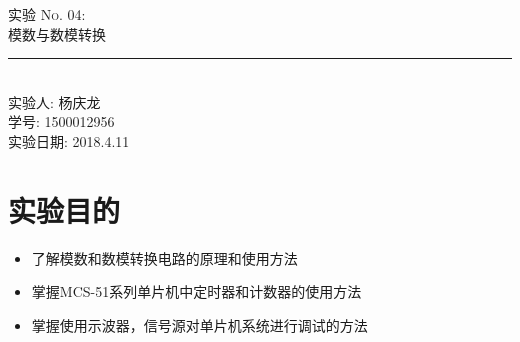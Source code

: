 
\newcommand{\labno}{04}
\newcommand{\labtitle}{模数与数模转换}
\newcommand{\authorname}{杨庆龙}
\newcommand{\idnumber}{1500012956}
\newcommand{\labdate}{2018.4.11}



\begin{CJK}

\begin{titlepage}
\begin{center}
{\LARGE \textsc{实验 No. \labno:} \\ \vspace{4pt}}
{\Large \textsc{\labtitle} \\ \vspace{4pt}}
\rule[13pt]{\textwidth}{1pt} \\ \vspace{150pt}
{\large 实验人: \authorname \\ \vspace{10pt}
学号: \idnumber \\ \vspace{10pt}
实验日期: \labdate}
\end{center}
\end{titlepage}





\section{实验目的}
\begin{itemize}
	\item 了解模数和数模转换电路的原理和使用方法
	\item 掌握MCS-51系列单片机中定时器和计数器的使用方法
	\item 掌握使用示波器，信号源对单片机系统进行调试的方法
\end{itemize}
\vspace{3mm}


\end{CJK}
